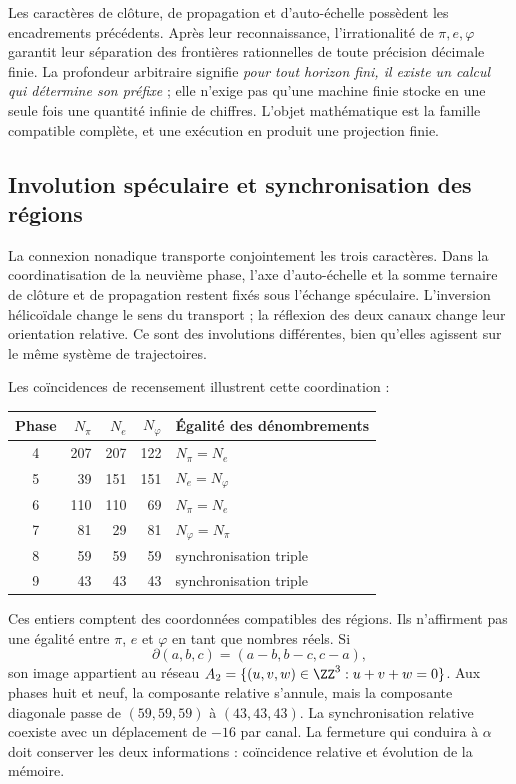 Les caractères de clôture, de propagation et d’auto-échelle possèdent les encadrements précédents. Après leur reconnaissance, l’irrationalité de \(\pi,e,\varphi\) garantit leur séparation des frontières rationnelles de toute précision décimale finie. La profondeur arbitraire signifie \emph{pour tout horizon fini, il existe un calcul qui détermine son préfixe} ; elle n’exige pas qu’une machine finie stocke en une seule fois une quantité infinie de chiffres. L’objet mathématique est la famille compatible complète, et une exécution en produit une projection finie.

\subsection{Involution spéculaire et synchronisation des régions}

La connexion nonadique transporte conjointement les trois caractères. Dans la coordinatisation de la neuvième phase, l'axe d'auto-échelle et la somme ternaire de clôture et de propagation restent fixés sous l'échange spéculaire. L'inversion hélicoïdale change le sens du transport ; la réflexion des deux canaux change leur orientation relative. Ce sont des involutions différentes, bien qu'elles agissent sur le même système de trajectoires.

Les coïncidences de recensement illustrent cette coordination :
\begin{center}
\begin{tabular}{@{}c rrr l@{}}\toprule
Phase&\(N_\pi\)&\(N_e\)&\(N_\varphi\)&Égalité des dénombrements\\\midrule
4&207&207&122&\(N_\pi=N_e\)\\
5&39&151&151&\(N_e=N_\varphi\)\\
6&110&110&69&\(N_\pi=N_e\)\\
7&81&29&81&\(N_\varphi=N_\pi\)\\
8&59&59&59&synchronisation triple\\
9&43&43&43&synchronisation triple\\\bottomrule
\end{tabular}
\end{center}
Ces entiers comptent des coordonnées compatibles des régions. Ils n'affirment pas une égalité entre \(\pi\), \(e\) et \(\varphi\) en tant que nombres réels. Si
\[
 \partial(a,b,c)=(a-b,b-c,c-a),
\]
son image appartient au réseau \(A_2=\{(u,v,w)\in\ZZ^3:u+v+w=0\}\). Aux phases huit et neuf, la composante relative s'annule, mais la composante diagonale passe de \((59,59,59)\) à \((43,43,43)\). La synchronisation relative coexiste avec un déplacement de \(-16\) par canal. La fermeture qui conduira à \(\alpha\) doit conserver les deux informations : coïncidence relative et évolution de la mémoire.

